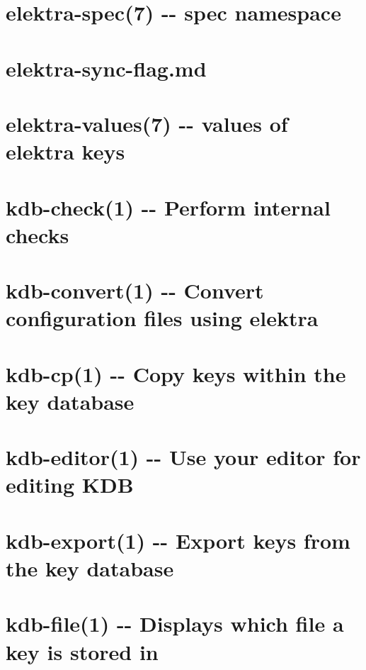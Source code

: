 \documentclass[twoside]{book}
\newcommand{\+}{\discretionary{\mbox{\scriptsize$\hookleftarrow$}}{}{}}
\begin{document}
\chapter{elektra-\/spec(7) -\/-\/ spec namespace}
\label{md_doc_help_elektra-spec}
\hypertarget{md_doc_help_elektra-spec}{}

\chapter{elektra-\/sync-\/flag.md}
\label{doc_help_elektra-sync-flag_md}
\hypertarget{doc_help_elektra-sync-flag_md}{}

\chapter{elektra-\/values(7) -\/-\/ values of elektra keys}
\label{md_doc_help_elektra-values}
\hypertarget{md_doc_help_elektra-values}{}

\chapter{kdb-\/check(1) -\/-\/ Perform internal checks}
\label{md_doc_help_kdb-check}
\hypertarget{md_doc_help_kdb-check}{}

\chapter{kdb-\/convert(1) -\/-\/ Convert configuration files using elektra}
\label{md_doc_help_kdb-convert}
\hypertarget{md_doc_help_kdb-convert}{}

\chapter{kdb-\/cp(1) -\/-\/ Copy keys within the key database}
\label{md_doc_help_kdb-cp}
\hypertarget{md_doc_help_kdb-cp}{}

\chapter{kdb-\/editor(1) -\/-\/ Use your editor for editing K\+D\+B}
\label{md_doc_help_kdb-editor}
\hypertarget{md_doc_help_kdb-editor}{}

\chapter{kdb-\/export(1) -\/-\/ Export keys from the key database}
\label{md_doc_help_kdb-export}
\hypertarget{md_doc_help_kdb-export}{}

\chapter{kdb-\/file(1) -\/-\/ Displays which file a key is stored in}
\label{md_doc_help_kdb-file}
\hypertarget{md_doc_help_kdb-file}{}

\end{document}

